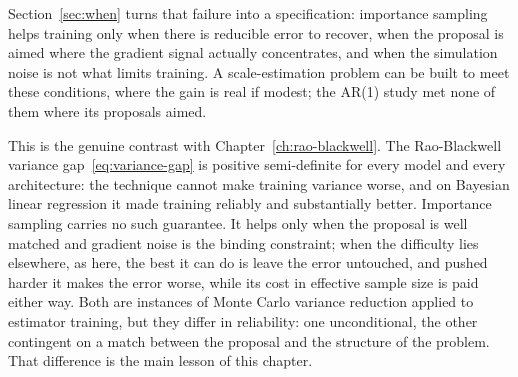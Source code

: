 Section~\ref{sec:when} turns that failure into a specification: importance
sampling helps training only when there is reducible error to recover,
when the proposal is aimed where the gradient signal actually
concentrates, and when the simulation noise is not what limits training. A
scale-estimation problem can be built to meet these conditions, where the
gain is real if modest; the AR(1) study met none of them where its
proposals aimed.

This is the genuine contrast with Chapter~\ref{ch:rao-blackwell}. The
Rao-Blackwell variance gap~\eqref{eq:variance-gap} is positive
semi-definite for every model and every architecture: the technique
cannot make training variance worse, and on Bayesian linear regression it made
training reliably and substantially better. Importance sampling carries
no such guarantee. It helps only when the proposal is well matched and
gradient noise is the binding constraint; when the difficulty lies
elsewhere, as here, the best it can do is leave the error untouched, and
pushed harder it makes the error worse, while its cost in effective sample
size is paid either way. Both are instances of Monte Carlo variance
reduction applied to estimator training, but they differ in reliability:
one unconditional, the other contingent on a match between the proposal
and the structure of the problem. That difference is the main lesson of
this chapter.